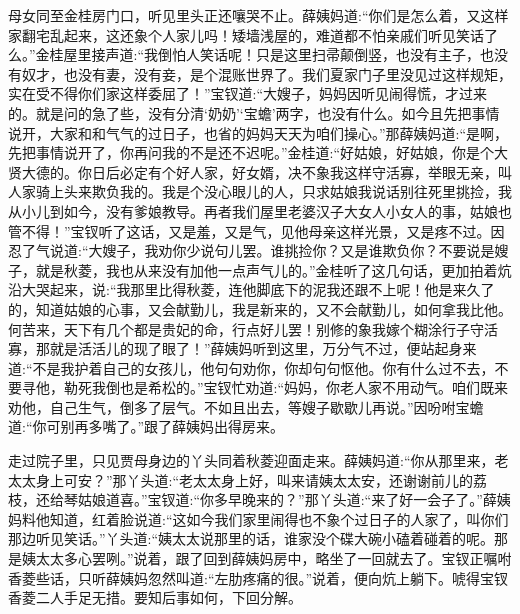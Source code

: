 \begin{parag}
    母女同至金桂房门口，听见里头正还嚷哭不止。薛姨妈道:“你们是怎么着，又这样家翻宅乱起来，这还象个人家儿吗！矮墙浅屋的，难道都不怕亲戚们听见笑话了么。”金桂屋里接声道:“我倒怕人笑话呢！只是这里扫帚颠倒竖，也没有主子，也没有奴才，也没有妻，没有妾，是个混账世界了。我们夏家门子里没见过这样规矩，实在受不得你们家这样委屈了！”宝钗道:“大嫂子，妈妈因听见闹得慌，才过来的。就是问的急了些，没有分清‘奶奶’‘宝蟾’两字，也没有什么。如今且先把事情说开，大家和和气气的过日子，也省的妈妈天天为咱们操心。”那薛姨妈道:“是啊，先把事情说开了，你再问我的不是还不迟呢。”金桂道:“好姑娘，好姑娘，你是个大贤大德的。你日后必定有个好人家，好女婿，决不象我这样守活寡，举眼无亲，叫人家骑上头来欺负我的。我是个没心眼儿的人，只求姑娘我说话别往死里挑捡，我从小儿到如今，没有爹娘教导。再者我们屋里老婆汉子大女人小女人的事，姑娘也管不得！”宝钗听了这话，又是羞，又是气，见他母亲这样光景，又是疼不过。因忍了气说道:“大嫂子，我劝你少说句儿罢。谁挑捡你？又是谁欺负你？不要说是嫂子，就是秋菱，我也从来没有加他一点声气儿的。”金桂听了这几句话，更加拍着炕沿大哭起来，说:“我那里比得秋菱，连他脚底下的泥我还跟不上呢！他是来久了的，知道姑娘的心事，又会献勤儿，我是新来的，又不会献勤儿，如何拿我比他。何苦来，天下有几个都是贵妃的命，行点好儿罢！别修的象我嫁个糊涂行子守活寡，那就是活活儿的现了眼了！”薛姨妈听到这里，万分气不过，便站起身来道:“不是我护着自己的女孩儿，他句句劝你，你却句句怄他。你有什么过不去，不要寻他，勒死我倒也是希松的。”宝钗忙劝道:“妈妈，你老人家不用动气。咱们既来劝他，自己生气，倒多了层气。不如且出去，等嫂子歇歇儿再说。”因吩咐宝蟾道:“你可别再多嘴了。”跟了薛姨妈出得房来。
\end{parag}


\begin{parag}
    走过院子里，只见贾母身边的丫头同着秋菱迎面走来。薛姨妈道:“你从那里来，老太太身上可安？”那丫头道:“老太太身上好，叫来请姨太太安，还谢谢前儿的荔枝，还给琴姑娘道喜。”宝钗道:“你多早晚来的？”那丫头道:“来了好一会子了。”薛姨妈料他知道，红着脸说道:“这如今我们家里闹得也不象个过日子的人家了，叫你们那边听见笑话。”丫头道:“姨太太说那里的话，谁家没个碟大碗小磕着碰着的呢。那是姨太太多心罢咧。”说着，跟了回到薛姨妈房中，略坐了一回就去了。宝钗正嘱咐香菱些话，只听薛姨妈忽然叫道:“左肋疼痛的很。”说着，便向炕上躺下。唬得宝钗香菱二人手足无措。要知后事如何，下回分解。
\end{parag}